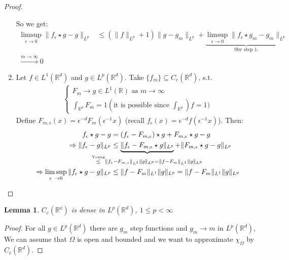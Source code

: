 \documentclass{report}
\theoremstyle{tommy}
\newtheorem{lem}[defn]{Lemma}
\begin{document}
\begin{proof}
\begin{enumerate}[label=Step \arabic*:]
      So we get:
      \begin{align*}
        \limsup_{\epsilon \to 0} \|f_\epsilon \star g - g\|_{L^p} 
        &\le (\|f\|_{L^p} + 1) \|g - g_m\|_{L^p} + \underbrace{\limsup_{\epsilon \to 0} \|f_\epsilon \star g_m - g_m\|_{L^p}}_{0 \text{by step 1.}} \\
        \xrightarrow{m \to \infty} 0
      \end{align*}
      \item Let \(f \in L^1(\mathbb{R}^d)\) and \(g \in L^p(\mathbb{R}^d)\). Take \(\{f_m\} \subseteq C_c(\mathbb{R}^d)\), s.t. 
      \begin{align*}
        \begin{cases}
          F_m \to g \in L^1(\mathbb{R}) \text{ as } m \to \infty \\
          \int_{\mathbb{R}^d} F_m = 1 (\text{it is possible since } \int_{\mathbb{R}^d}) f = 1)
        \end{cases}
      \end{align*} 
      Define \(F_{m, \epsilon}(x) = \epsilon^{-d} F_m(\epsilon^{-1} x)\) (recall \(f_\epsilon(x) = \epsilon^{-d} f(\epsilon^{-1} x)\)). Then:
      \begin{align*}
        f_\epsilon \star g - g &= (f_\epsilon - F_{m, \epsilon}) \star g + F_{m, \epsilon} \star g -g \\
        \Rightarrow \|f_\epsilon - g \|_{L^p} &\le \underbrace{\|f_\epsilon - F_{m, \epsilon} \star g\|_{L^p}}_{\mathclap{\overset{\text{Young}}{\le} \|f_\epsilon - F_{m, \epsilon}\|_{L^1} \|g\|_{L^p} = \|f - F_m\|_{L^1} \|g\|_{L^p}}} + \|F_{m, \epsilon} \star g - g\|_{L^p} \\
        \Rightarrow \limsup_{\epsilon \to 0} \|f_\epsilon \star g - g\|_{L^p} &\le \|f - F_m\|_{L^1} \|g\|_{L^p} = \|f - F_m\|_{L^1} \|g \|_{L^p} \qedhere
      \end{align*}
    \end{enumerate}
  \end{proof}

  
  \begin{lem}
    \(C_c(\mathbb{{R}^d})\) is dense in \(L^p(\mathbb{R}^d)\), \(1 \le p < \infty\)
  \end{lem}

  \begin{proof}
    For all \(g \in L^p(\mathbb{R}^d)\) there are \(g_m\) step functions and \(g_m \to m\) in \(L^p(\mathbb{R}^d)\),
    We can assume that \(\Omega\) is open and bounded and we want to approximate \(\chi_\Omega\) by \(C_c(\mathbb{R}^d)\). 
  \end{proof}
\end{document}
